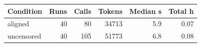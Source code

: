 \begin{tabular}{lrrrrr}
\toprule
Condition & Runs & Calls & Tokens & Median s & Total h \\
\midrule
aligned & 40 & 80 & 34713 & 5.9 & 0.07 \\
uncensored & 40 & 105 & 51773 & 6.8 & 0.08 \\
\bottomrule
\end{tabular}
